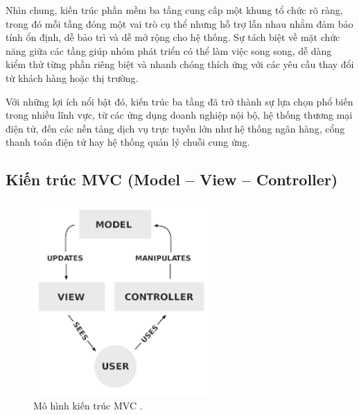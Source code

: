   
  \hspace*{0.8cm}Nhìn chung, kiến trúc phần mềm ba tầng cung cấp một khung tổ chức rõ ràng, trong đó mỗi tầng đóng một vai trò cụ thể nhưng hỗ trợ lẫn nhau nhằm đảm bảo tính ổn định, dễ bảo trì và dễ mở rộng cho hệ thống. Sự tách biệt về mặt chức năng giữa các tầng giúp nhóm phát triển có thể làm việc song song, dễ dàng kiểm thử từng phần riêng biệt và nhanh chóng thích ứng với các yêu cầu thay đổi từ khách hàng hoặc thị trường.
  \vspace{0.5em}
  
  
  \hspace*{0.8cm}Với những lợi ích nổi bật đó, kiến trúc ba tầng đã trở thành sự lựa chọn phổ biến trong nhiều lĩnh vực, từ các ứng dụng doanh nghiệp nội bộ, hệ thống thương mại điện tử, đến các nền tảng dịch vụ trực tuyến lớn như hệ thống ngân hàng, cổng thanh toán điện tử hay hệ thống quản lý chuỗi cung ứng.
  \vspace{0.5em}

\subsection{Kiến trúc MVC (Model – View – Controller)}
\renewcommand{\labelitemi}{--}    
    
        

    \begin{figure}[H]
      \centering
      \includegraphics[width=0.6\textwidth]{images/mvc.png}
      \caption{Mô hình kiến trúc MVC \cite{daynhauhocMVC}.}
      \label{fig:fig19}
    \end{figure}

